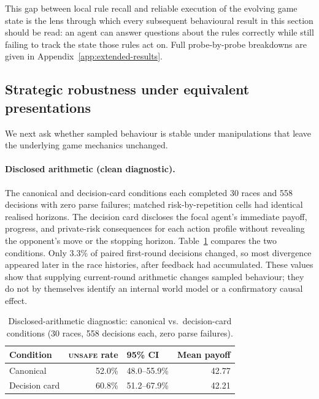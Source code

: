 \documentclass[sigconf]{aamas}
\newcommand{\Unsafe}{\textsc{unsafe}}
\begin{document}
This gap between local rule recall and reliable execution of the evolving
game state is the lens through which every subsequent behavioural result in
this section should be read: an agent can answer questions about the rules
correctly while still failing to track the state those rules act on. Full
probe-by-probe breakdowns are given in
Appendix~\ref{app:extended-results}.

\subsection{Strategic robustness under equivalent presentations}
\label{sec:results-sensitivity}

We next ask whether sampled behaviour is stable under manipulations that
leave the underlying game mechanics unchanged.

\paragraph{Disclosed arithmetic (clean diagnostic).} The canonical and
decision-card conditions each completed 30 races and 558 decisions with
zero parse failures; matched risk-by-repetition cells had identical
realised horizons. The decision card discloses the focal agent's immediate
payoff, progress, and private-risk consequences for each action profile
without revealing the opponent's move or the stopping horizon.
Table~\ref{tab:disclosed-arithmetic} compares the two conditions. Only
3.3\% of paired first-round decisions changed, so most divergence appeared
later in the race histories, after feedback had accumulated. These values
show that supplying current-round arithmetic changes sampled behaviour;
they do not by themselves identify an internal world model or a
confirmatory causal effect.

\begin{table}[t]
    \caption{Disclosed-arithmetic diagnostic: canonical vs.\ decision-card
    conditions (30 races, 558 decisions each, zero parse failures).}
    \label{tab:disclosed-arithmetic}
    \centering
    \small
    \begin{tabular}{@{}lrlr@{}}
        \toprule
        Condition & \Unsafe{} rate & 95\% CI & Mean payoff \\
        \midrule
        Canonical      & 52.0\% & 48.0--55.9\% & 42.77 \\
        Decision card  & 60.8\% & 51.2--67.9\% & 42.21 \\
        \bottomrule
    \end{tabular}
\end{table}
\end{document}
